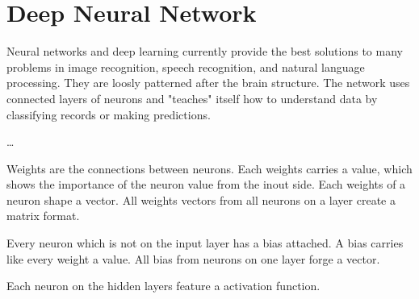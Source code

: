 \section{Deep Neural Network}

Neural networks and deep learning currently provide the best solutions to many problems in image recognition, speech recognition, and natural language processing.
\cite{nielsen-book}
They are loosly patterned after the brain structure.
The network uses connected layers of neurons and "teaches" itself how to understand data by classifying records or making predictions.
\cite{ibm-watson-healthcare}

…

Weights are the connections between neurons.
Each weights carries a value, which shows the importance of the neuron value from the inout side.
Each weights of a neuron shape a vector.
All weights vectors from all neurons on a layer create a matrix format.

Every neuron which is not on the input layer has a bias attached.
A bias carries like every weight a value.
All bias from neurons on one layer forge a vector.

Each neuron on the hidden layers feature a activation function.

